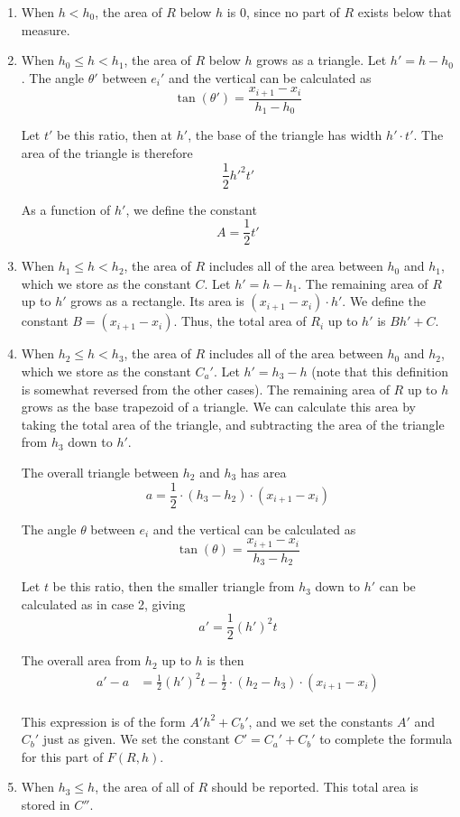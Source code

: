 \begin{enumerate}
\item When $h < h_0$, the area of $R$ below $h$ is 0, since no part of $R$ exists below that measure.

\item When $h_0 \leq h < h_1$, the area of $R$ below $h$ grows as a triangle. Let $h' = h - h_0$.
The angle $\theta'$ between $e_i'$ and the vertical can be calculated as 
\[ 
\tan(\theta') = \frac{x_{i+1} - x_i}{h_1 - h_0}
\]

Let $t'$ be this ratio, then at $h'$, the base of the triangle has width $h' \cdot t'$. The area of the triangle is therefore
\[ 
\frac{1}{2} h'^2 t'
\]

As a function of $h'$, we define the constant 
\[
A = \frac{1}{2} t'
\]

\item When $h_1 \leq h < h_2$, the area of $R$ includes all of the area between $h_0$ and $h_1$, which we store as the constant $C$.  Let $h' = h - h_1$. The remaining area of $R$ up to $h'$ grows as a rectangle.  Its area is $(x_{i+1} - x_i)\cdot h'$. We define the constant $B = (x_{i+1} - x_i)$.  Thus, the total area of $R_i$ up to $h'$ is $Bh' + C$.

\item When $h_2 \leq h < h_3$, the area of $R$ includes all of the area between $h_0$ and $h_2$, which we store as the constant $C_a'$. Let $h' = h_3 - h$ (note that this definition is somewhat reversed from the other cases). The remaining area of $R$ up to $h$ grows as the base trapezoid of a triangle. We can calculate this area by taking the total area of the triangle, and subtracting the area of the triangle from $h_3$ down to $h'$.  

The overall triangle between $h_2$ and $h_3$ has area 
\[ 
a = \frac{1}{2} \cdot (h_3 - h_2) \cdot (x_{i+1} - x_i) 
\]

The angle $\theta$ between $e_i$ and the vertical can be calculated as
\[ 
\tan(\theta) = \frac{x_{i+1} - x_i}{h_3 - h_2}
\]

Let $t$ be this ratio, then the smaller triangle from $h_3$ down to $h'$ can be calculated as in case 2, giving
\[
a' = \frac{1}{2}(h')^2 t
\]

The overall area from $h_2$ up to $h$ is then
\[ 
\begin{split}
a' - a &= \frac{1}{2}(h')^2 t - \frac{1}{2} \cdot (h_2 - h_3) \cdot (x_{i+1} - x_i) \\
%
\end{split}
\]

This expression is of the form $A'h^2 + C_b'$, and we set the constants $A'$ and $C_b'$ just as given.  We set the constant $C' = C_a' + C_b'$ to complete the formula for this part of $F(R, h)$.

\item When $h_3 \leq h$, the area of all of $R$ should be reported.  This total area is stored in $C''$.

\end{enumerate}

